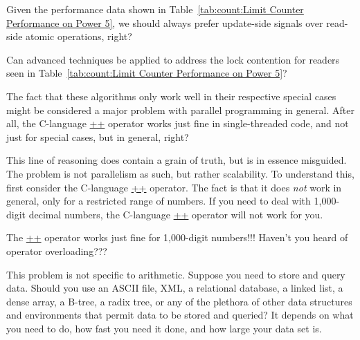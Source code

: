 \QuickQuiz{}
	Given the performance data shown in
	Table~\ref{tab:count:Limit Counter Performance on Power 5},
	we should always prefer update-side signals over read-side
	atomic operations, right?
 \QuickQuizEnd

\QuickQuiz{}
	Can advanced techniques be applied to address the lock
	contention for readers seen in
	Table~\ref{tab:count:Limit Counter Performance on Power 5}?
 \QuickQuizEnd

The fact that these algorithms only work well in their respective special
cases might be considered a major problem with parallel programming in
general.
After all, the C-language \url{++} operator works just fine in single-threaded
code, and not just for special cases, but in general, right?

This line of reasoning does contain a grain of truth, but is in essence
misguided.
The problem is not parallelism as such, but rather scalability.
To understand this, first consider the C-language \url{++} operator.
The fact is that it does \emph{not} work in general, only for a restricted
range of numbers.
If you need to deal with 1,000-digit decimal numbers, the C-language \url{++}
operator will not work for you.

\QuickQuiz{}
	The \url{++} operator works just fine for 1,000-digit numbers!!!
	Haven't you heard of operator overloading???
 \QuickQuizEnd

This problem is not specific to arithmetic.
Suppose you need to store and query data.
Should you use an ASCII file, XML, a relational database, a linked list,
a dense array, a B-tree, a radix tree, or any of the plethora of other data
structures and environments that permit data to be stored and queried?
It depends on what you need to do, how fast you need it done, and how
large your data set is.

